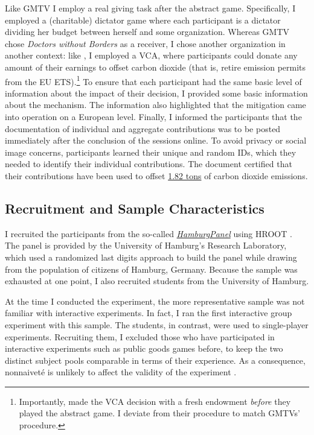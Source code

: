 \documentclass[
  authoryear,
  review,
  3p,
  onecolumn]{elsarticle}
\begin{document}
Like GMTV I employ a real giving task after the abstract game.
Specifically, I employed a (charitable) dictator game where each
participant is a dictator dividing her budget between herself and some
organization. Whereas GMTV chose \emph{Doctors without Borders} as a
receiver, I chose another organization in another context: like
\citet{GKLS2020}, I employed a VCA, where participants could donate any
amount of their earnings to offset carbon dioxide (that is, retire
emission permits from the EU ETS).\footnote{Importantly,
  \citet{GKLS2020} made the VCA decision with a fresh endowment
  \emph{before} they played the abstract game. I deviate from their
  procedure to match GMTVs' procedure.} To ensure that each participant
had the same basic level of information about the impact of their
decision, I provided some basic information about the mechanism. The
information also highlighted that the mitigation came into operation on
a European level. Finally, I informed the participants that the
documentation of individual and aggregate contributions was to be posted
immediately after the conclusion of the sessions online. To avoid
privacy or social image concerns, participants learned their unique and
random IDs, which they needed to identify their individual
contributions. The document certified that their contributions have been
used to offset
\href{https://www.compensators.org/compensatelist/?searchterm=stefan+traub}{1.82
tons} of carbon dioxide emissions.

\hypertarget{sec-sample}{%
\subsection{Recruitment and Sample Characteristics}\label{sec-sample}}

I recruited the participants from the so-called
\emph{\href{https://www.wiso.uni-hamburg.de/forschung/forschungslabor/umfragelabor/aktuelle-umfragen/hamburgpanel.html}{HamburgPanel}}
using HROOT \citep{hroot}. The panel is provided by the University of
Hamburg's Research Laboratory, which used a randomized last digits
approach to build the panel while drawing from the population of
citizens of Hamburg, Germany. Because the sample was exhausted at one
point, I also recruited students from the University of Hamburg.

At the time I conducted the experiment, the more representative sample
was not familiar with interactive experiments. In fact, I ran the first
interactive group experiment with this sample. The students, in
contrast, were used to single-player experiments. Recruiting them, I
excluded those who have participated in interactive experiments such as
public goods games before, to keep the two distinct subject pools
comparable in terms of their experience. As a consequence, nonnaiveté is
unlikely to affect the validity of the experiment \citep[
p.~204]{GoodmanPaolacci2017}.
\end{document}
